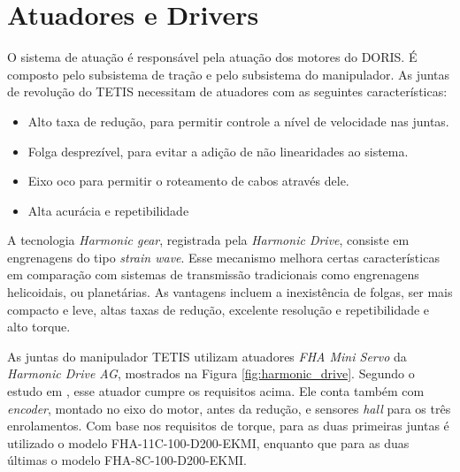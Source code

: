 \section{Atuadores e Drivers}

O sistema de atuação é responsável pela atuação dos motores do DORIS. É composto pelo subsistema de tração e pelo subsistema do manipulador. As juntas de revolução do TETIS necessitam de atuadores com as seguintes características:

\begin{itemize}
\item Alto taxa de redução, para permitir controle a nível de velocidade nas juntas.
\item Folga desprezível, para evitar a adição de não linearidades ao sistema. 
\item Eixo oco para permitir o roteamento de cabos através dele.
\item Alta acurácia e repetibilidade
\end{itemize}

A tecnologia \textit{Harmonic gear}, registrada pela \textit{Harmonic Drive}, consiste em engrenagens do tipo \textit{strain wave}. Esse mecanismo melhora certas características em comparação com sistemas de transmissão tradicionais como engrenagens helicoidais, ou planetárias. As vantagens incluem a inexistência de folgas, ser mais compacto e leve, altas taxas de redução, excelente resolução e repetibilidade e alto torque.

As juntas do manipulador TETIS utilizam atuadores \textit{FHA Mini Servo} da \textit{Harmonic Drive AG}, mostrados na Figura \ref{fig:harmonic_drive}. Segundo o estudo em \citep{xaud2016doris}, esse atuador cumpre os requisitos acima. Ele conta também com \textit{encoder}, montado no eixo do motor, antes da redução, e sensores \textit{hall} para os três enrolamentos. Com base nos requisitos de torque, para as duas primeiras juntas é utilizado o modelo FHA-11C-100-D200-EKMI, enquanto que para as duas últimas o modelo FHA-8C-100-D200-EKMI.

\newlength{\twosubht}
\newsavebox{\twosubbox}

